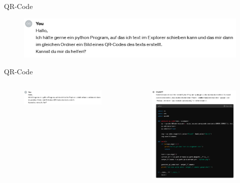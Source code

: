 \documentclass[a4paper,
	DIV=13,
	14pt,
	BCOR=10mm,
	department=FakEI,
	twoside,
	parskip=half,
	automark,
	aspectratio=169
]{beamer}
\begin{document}
\begin{frame}{QR-Code}
	\begin{figure}[H]
		\includegraphics[width=\linewidth]{img/ChatGPT-code-Q.png}
	\end{figure}
\end{frame}

\begin{frame}{QR-Code}
	\begin{columns}
		\begin{figure}[H]
			\includegraphics[width=\linewidth]{img/ChatGPT-code-Q.png}
		\end{figure}

		\begin{figure}[H]
			\includegraphics[height=0.8\textheight]{img/ChatGPT-code-A.png}
		\end{figure}
	\end{columns}
\end{frame}
\end{document}
